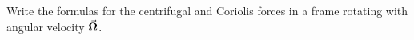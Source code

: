 

\vspace*{\fill}
\centering

Write the formulas for the centrifugal and Coriolis forces in a frame rotating with angular velocity $\va*{\Omega}$.

\centering
\vspace*{\fill}


